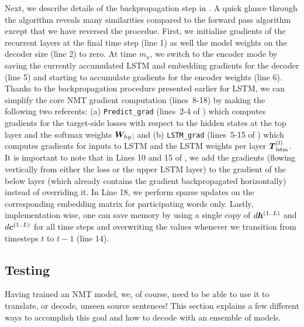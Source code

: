 Next, we describe details of the backpropagation step in .
A quick glance through the algorithm reveals many similarities compared to the
forward pass algorithm except that we have reversed the procedue. 
First, we initialize gradients of the recurrent layers at the final time step (line 1)
as well the model weights on the decoder size (line 2) to zero.
At time $m_x$, we switch to the encoder mode by saving the currently
accumulated LSTM and embedding gradients for the decoder (line 5) and 
starting to accumulate gradients for the encoder weights (line 6). 
Thanks to the backpropagation
procedure presented earlier for LSTM, we can simplify the core NMT gradient
computation (lines~8-18) by making the following two referents: (a)
\texttt{Predict\_grad} (lines~2-4 of ) which computes gradients for the target-side
losses with respect to the hidden states at the top layer and the softmax
weights $\bm{W}_{hy}$; and (b) \texttt{LSTM\_grad} (lines~5-15 of
) which computes gradients for inputs to LSTM and the LSTM
weights per layer $\mbox{\boldmath{$T$}}_{\text{lstm}}^{(l)}$. It is important to note that in Lines 10 and 15 of
, we add the gradients (flowing vertically from either the
loss or the upper LSTM layer) to the gradient of the below layer (which already
contains the gradient backpropagated horizontally)
instead of overriding it. In Line 18, we perform
sparse updates on the corresponding embedding matrix for participating words
only. Lastly, implementation wise, one can save memory by using a single copy of
$d\bm{h}_{}^{(1..L)}$ and $d\bm{c}_{}^{(1..L)}$ for all time steps and overwriting the values
whenever we transition from timesteps $t$ to $t-1$ (line 14).

\subsection{Testing}
Having trained an NMT model, we, of course, need to be able to use it to
translate, or decode, unseen source sentences! This section explains a few different ways to 
accomplish this goal and how to decode with an ensemble of models.

